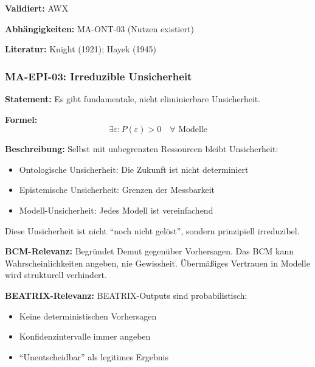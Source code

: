\textbf{Validiert:} AWX

\textbf{Abhängigkeiten:} MA-ONT-03 (Nutzen existiert)

\textbf{Literatur:} Knight (1921); Hayek (1945)



\subsubsection*{MA-EPI-03: Irreduzible Unsicherheit}

\textbf{Statement:} Es gibt fundamentale, nicht eliminierbare Unsicherheit.

\textbf{Formel:}
\begin{equation}
\exists \varepsilon: P(\varepsilon) > 0 \quad \forall \text{ Modelle}
\end{equation}

\textbf{Beschreibung:}
Selbst mit unbegrenzten Ressourcen bleibt Unsicherheit:
\begin{itemize}
    \item Ontologische Unsicherheit: Die Zukunft ist nicht determiniert
    \item Epistemische Unsicherheit: Grenzen der Messbarkeit
    \item Modell-Unsicherheit: Jedes Modell ist vereinfachend
\end{itemize}
Diese Unsicherheit ist nicht ``noch nicht gelöst'', sondern prinzipiell irreduzibel.

\textbf{BCM-Relevanz:}
Begründet Demut gegenüber Vorhersagen. Das BCM kann Wahrscheinlichkeiten angeben, nie Gewissheit. Übermäßiges Vertrauen in Modelle wird strukturell verhindert.

\textbf{BEATRIX-Relevanz:}
BEATRIX-Outputs sind probabilistisch:
\begin{itemize}
    \item Keine deterministischen Vorhersagen
    \item Konfidenzintervalle immer angeben
    \item ``Unentscheidbar'' als legitimes Ergebnis
\end{itemize}

